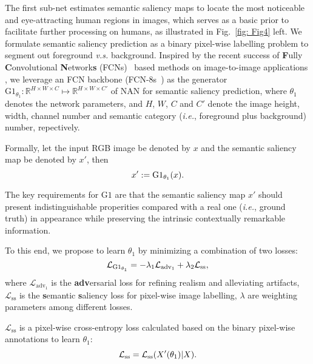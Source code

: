 \documentclass[10pt,twocolumn,letterpaper]{article}
\theoremstyle{definition}
\theoremstyle{remark}
\begin{document}
The first sub-net estimates semantic saliency maps to locate the most noticeable and eye-attracting human regions in images, which serves as a basic prior to facilitate further processing on humans, as illustrated in Fig.~\ref{fig: Fig4} left. We formulate semantic saliency prediction as a binary pixel-wise labelling problem to segment out foreground \emph{v.s.} background. Inspired by the recent success of \textbf{F}ully \textbf{C}onvolutional \textbf{N}etwork\textbf{s} (FCNs)~\cite{long2015fully} based methods on image-to-image applications \cite{li2017instance, he2017mask}, we leverage an FCN backbone (FCN-8s~\cite{long2015fully}) as the generator $\mathrm{G1}_{\theta_1} : \mathbb{R}^{H \times W \times C} \mapsto \mathbb{R}^{H \times W \times C{'}}$ of NAN for semantic saliency prediction, where $\theta_1$ denotes the network parameters, and $H$, $W$, $C$ and $C{'}$ denote the image height, width, channel number and semantic category (\emph{i.e.}, foreground plus background) number, repectively.

Formally, let the input RGB image be denoted by $x$ and the semantic saliency map be denoted by $x{'}$, then
\begin{equation}
\small
x{'} := \mathrm{G1}_{\theta_1}(x).
\end{equation}

The key requirements for $\mathrm{G1}$ are that the semantic saliency map $x{'}$ should present indistinguishable properities compared with a real one (\emph{i.e.}, ground truth) in appearance while preserving the intrinsic contextually remarkable information.

To this end, we propose to learn $\theta_1$ by minimizing a combination of two losses:
\begin{equation}
\small
\mathcal{L}_{\mathrm{G1_{\theta_1}}}=-\lambda_1 \mathcal{L}_{\mathrm{adv}_1}+\lambda_2\mathcal{L}_{\mathrm{ss}},
\end{equation}
where $\mathcal{L}_{\mathrm{adv}_1}$ is the \textbf{adv}ersarial loss for refining realism and alleviating artifacts, $\mathcal{L}_{\mathrm{ss}}$ is the \textbf{s}emantic \textbf{s}aliency loss for pixel-wise image labelling, $\lambda$ are weighting parameters among different losses.

$\mathcal{L}_{\mathrm{ss}}$ is a pixel-wise cross-entropy loss calculated based on the binary pixel-wise annotations to learn $\theta_1$:
\begin{equation}
\small
\mathcal{L}_{\mathrm{ss}} = \mathcal{L}_{\mathrm{ss}}(X{'}(\theta_1)|X).
\end{equation}
\end{document}
